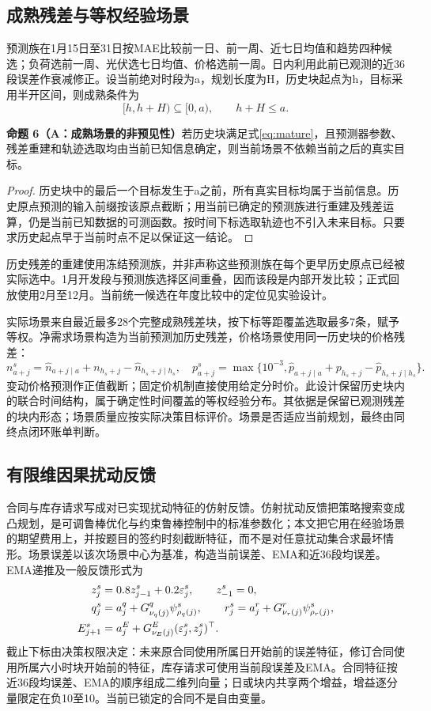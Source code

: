 \documentclass[UTF8,a4paper,zihao=-4,fontset=mac]{ctexart}
\newcommand{\pp}[2]{\par\noindent\textbf{命题 #1（#2）}\quad}
\begin{document}
\subsection{成熟残差与等权经验场景}
预测族在1月15日至31日按MAE比较前一日、前一周、近七日均值和趋势四种候选；负荷选前一周、光伏选七日均值、价格选前一周。日内利用此前已观测的近36段误差作衰减修正。设当前绝对时段为a，规划长度为H，历史块起点为h，目标采用半开区间，则成熟条件为
\begin{equation}\label{eq:mature}
 [h,h+H)\subseteq[0,a),\qquad h+H\le a.
\end{equation}
\pp{6}{A：成熟场景的非预见性}若历史块满足式\eqref{eq:mature}，且预测器参数、残差重建和轨迹选取均由当前已知信息确定，则当前场景不依赖当前之后的真实目标。
\begin{proof}
历史块中的最后一个目标发生于a之前，所有真实目标均属于当前信息。历史原点预测的输入前缀按该原点截断；用当前已确定的预测族进行重建及残差运算，仍是当前已知数据的可测函数。按时间下标选取轨迹也不引入未来目标。只要求历史起点早于当前时点不足以保证这一结论。
\end{proof}
历史残差的重建使用冻结预测族，并非声称这些预测族在每个更早历史原点已经被实际选中。1月开发段与预测族选择区间重叠，因而该段是内部开发比较；正式回放使用2月至12月。当前统一候选在年度比较中的定位见实验设计。

实际场景来自最近最多28个完整成熟残差块，按下标等距覆盖选取最多7条，赋予等权。净需求场景构造为当前预测加历史残差，价格场景使用同一历史块的价格残差：
\begin{equation}\label{eq:scenario}
 n_{a+j}^{s}=\widehat n_{a+j\mid a}+n_{h_s+j}-\widehat n_{h_s+j\mid h_s},\quad
 p_{a+j}^{s}=\max\{10^{-3},\widehat p_{a+j\mid a}+p_{h_s+j}-\widehat p_{h_s+j\mid h_s}\}.
\end{equation}
变动价格预测作正值截断；固定价机制直接使用给定分时价。此设计保留历史块内的联合时间结构，属于确定性时间覆盖的等权经验分布。其依据是保留已观测残差的块内形态；场景质量应按实际决策目标评价\cite{kaut2007}。场景是否适应当前规划，最终由同终点闭环账单判断。


\subsection{有限维因果扰动反馈}
合同与库存请求写成对已实现扰动特征的仿射反馈。仿射扰动反馈把策略搜索变成凸规划，是可调鲁棒优化与约束鲁棒控制中的标准参数化\cite{bental2004,goulart2006}；本文把它用在经验场景的期望费用上，并按题目的签约时刻截断特征，而不是对任意扰动集合求最坏情形。场景误差以该次场景中心为基准，构造当前误差、EMA和近36段均误差。EMA递推及一般反馈形式为
\begin{align}
 z_j^s&=0.8z_{j-1}^s+0.2\varepsilon_j^s,\qquad z_{-1}^s=0,\label{eq:ema}\\
 q_j^s&=a_j^q+G_{\nu_q(j)}^q\psi_{\rho_q(j)}^s,\qquad
 r_j^s=a_j^r+G_{\nu_r(j)}^r\psi_{\rho_r(j)}^s,\label{eq:affine}\\
 E_{j+1}^s&=a_j^E+G_{\nu_E(j)}^E(\varepsilon_j^s,z_j^s)^\top.\notag
\end{align}
截止下标由决策权限决定：未来原合同使用所属日开始前的误差特征，修订合同使用所属六小时块开始前的特征，库存请求可使用当前段误差及EMA。合同特征按近36段均误差、EMA的顺序组成二维列向量；日或块内共享两个增益，增益逐分量限定在负10至10。当前已锁定的合同不是自由变量。
\end{document}

